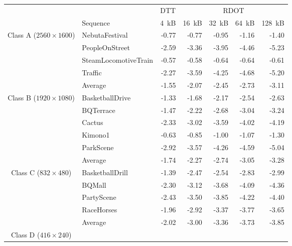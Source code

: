 \documentclass[11pt,a4paper,openright,twoside]{book}
\numberwithin{equation}{section} %
\numberwithin{figure}{section} %
\numberwithin{table}{section} %
\begin{document}
\begin{table}[tb]
	\centering
	\small
	\begin{tabularx}{\textwidth}{c|X|r|rrrr}
		\multicolumn{2}{c}{} &
		\multicolumn{1}{c|}{\acs{DTT}} &
		\multicolumn{4}{c}{\acs{RDOT}} \\
		\cline{2-7}
		\multicolumn{1}{c}{} & {Sequence} &
		\SI{4}{\kilo B} &
		\SI{16}{\kilo B} &
		\SI{32}{\kilo B} &
		\SI{64}{\kilo B} &
		\SI{128}{\kilo B} \\
		\hline
		\hline
		\multirow{5}{2cm}{\centering Class A ($2560\times1600$)}
		& NebutaFestival         & -0.77 & -0.77 & -0.95 & -1.16 & -1.40 \\
		& PeopleOnStreet         & -2.59 & -3.36 & -3.95 & -4.46 & -5.23 \\
		& SteamLocomotiveTrain   & -0.57 & -0.58 & -0.64 & -0.64 & -0.61 \\
		& Traffic                & -2.27 & -3.59 & -4.25 & -4.68 & -5.20 \\
		\cline{2-7} &
		Average                  & -1.55 & -2.07 & -2.45 & -2.73 & -3.11 \\
		\hline
		\hline
		\multirow{6}{2cm}{\centering Class B ($1920\times1080$)}
		& BasketballDrive        & -1.33 & -1.68 & -2.17 & -2.54 & -2.63 \\
		& BQTerrace              & -1.47 & -2.22 & -2.68 & -3.04 & -3.24 \\
		& Cactus                 & -2.33 & -3.02 & -3.59 & -4.02 & -4.19 \\
		& Kimono1                & -0.63 & -0.85 & -1.00 & -1.07 & -1.30 \\
		& ParkScene              & -2.92 & -3.57 & -4.26 & -4.59 & -5.04 \\
		\cline{2-7} &
		Average                  & -1.74 & -2.27 & -2.74 & -3.05 & -3.28 \\
		\hline
		\hline
		\multirow{5}{2cm}{\centering Class C ($832\times480$)}
		& BasketballDrill        & -1.39 & -2.47 & -2.54 & -2.83 & -2.99 \\
		& BQMall                 & -2.30 & -3.12 & -3.68 & -4.09 & -4.36 \\
		& PartyScene             & -2.43 & -3.50 & -3.85 & -4.22 & -4.40 \\
		& RaceHorses             & -1.96 & -2.92 & -3.37 & -3.77 & -3.65 \\
		\cline{2-7} &
		Average                  & -2.02 & -3.00 & -3.36 & -3.73 & -3.85 \\
		\hline
		\hline
		\multirow{5}{2cm}{\centering Class D ($416\times240$)}

\end{tabularx}
\end{table}
\end{document}
